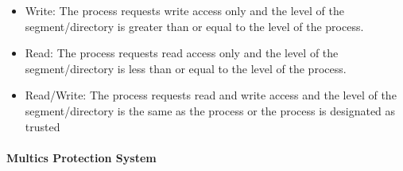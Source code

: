 \documentclass[
  12pt]{findlay}
\providecommand{\tightlist}{%
  \setlength{\itemsep}{0pt}\setlength{\parskip}{0pt}}
\begin{document}
\begin{itemize}
\begin{itemize}
    \begin{itemize}
    \tightlist
    \item
      Write: The process requests write access only and the level of the
      segment/directory is greater than or equal to the level of the
      process.
    \item
      Read: The process requests read access only and the level of the
      segment/directory is less than or equal to the level of the
      process.
    \item
      Read/Write: The process requests read and write access and the
      level of the segment/directory is the same as the process or the
      process is designated as trusted
    \end{itemize}
  \end{itemize}
\end{itemize}

\hypertarget{multics-protection-system}{%
\paragraph{Multics Protection System}\label{multics-protection-system}}
\end{document}
